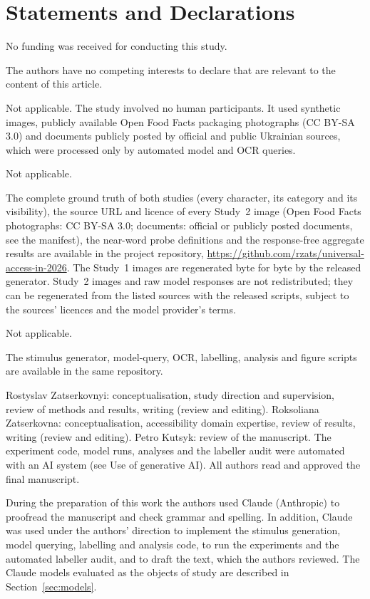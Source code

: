 \documentclass[pdflatex,sn-mathphys-num]{sn-jnl}%
\theoremstyle{thmstyleone}%
\theoremstyle{thmstyletwo}%
\theoremstyle{thmstylethree}%
\begin{document}
\section*{Statements and Declarations}

No funding was received for conducting this study.

The authors have no competing interests to declare that are relevant to the content of this article.

Not applicable. The study involved no human participants. It used synthetic images, publicly available Open Food Facts packaging photographs (CC BY-SA 3.0) and documents publicly posted by official and public Ukrainian sources, which were processed only by automated model and OCR queries.

Not applicable.

The complete ground truth of both studies (every character, its category and its visibility), the source URL and licence of every Study~2 image (Open Food Facts photographs: CC BY-SA 3.0; documents: official or publicly posted documents, see the manifest), the near-word probe definitions and the response-free aggregate results are available in the project repository, \url{https://github.com/rzats/universal-access-in-2026}. The Study~1 images are regenerated byte for byte by the released generator. Study~2 images and raw model responses are not redistributed; they can be regenerated from the listed sources with the released scripts, subject to the sources' licences and the model provider's terms.

Not applicable.

The stimulus generator, model-query, OCR, labelling, analysis and figure scripts are available in the same repository.

Rostyslav Zatserkovnyi: conceptualisation, study direction and supervision, review of methods and results, writing (review and editing). Roksoliana Zatserkovna: conceptualisation, accessibility domain expertise, review of results, writing (review and editing). Petro Kutsyk: review of the manuscript. The experiment code, model runs, analyses and the labeller audit were automated with an AI system (see Use of generative AI). All authors read and approved the final manuscript.

During the preparation of this work the authors used Claude (Anthropic) to proofread the manuscript and check grammar and spelling. In addition, Claude was used under the authors' direction to implement the stimulus generation, model querying, labelling and analysis code, to run the experiments and the automated labeller audit, and to draft the text, which the authors reviewed. The Claude models evaluated as the objects of study are described in Section~\ref{sec:models}.
\end{document}
